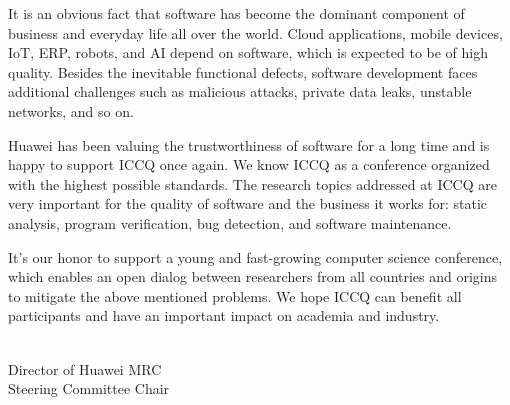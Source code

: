 
\cleardoublepage
{}

It is an obvious fact that software has become the dominant component of business and everyday life all over the world. Cloud applications, mobile devices, IoT, ERP, robots, and AI depend on software, which is expected to be of high quality. Besides the inevitable functional defects, software development faces additional challenges such as malicious attacks, private data leaks, unstable networks, and so on.

Huawei has been valuing the trustworthiness of software for a long time and is happy to support ICCQ once again. We know ICCQ as a conference organized with the highest possible standards. The research topics addressed at ICCQ are very important for the quality of software and the business it works for: static analysis, program verification, bug detection, and software maintenance.

It's our honor to support a young and fast-growing computer science conference, which enables an open dialog between researchers from all countries and origins to mitigate the above mentioned problems. We hope ICCQ can benefit all participants and have an important impact on academia and industry.

\vspace{18pt}
 \\
Director of Huawei MRC \\
Steering Committee Chair
